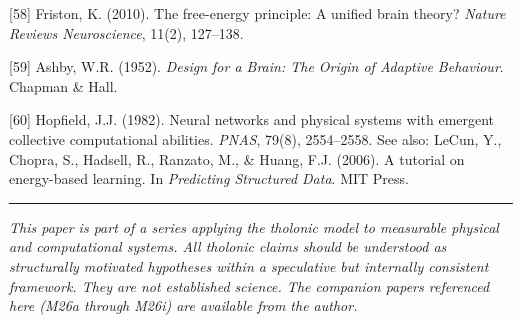 \documentclass[
  11pt,
  letterpaper,
]{article}
\begin{document}
{[}58{]} Friston, K. (2010). The free-energy principle: A unified brain
theory? \emph{Nature Reviews Neuroscience}, 11(2), 127--138.

{[}59{]} Ashby, W.R. (1952). \emph{Design for a Brain: The Origin of
Adaptive Behaviour}. Chapman \& Hall.

{[}60{]} Hopfield, J.J. (1982). Neural networks and physical systems
with emergent collective computational abilities. \emph{PNAS}, 79(8),
2554--2558. See also: LeCun, Y., Chopra, S., Hadsell, R., Ranzato, M.,
\& Huang, F.J. (2006). A tutorial on energy-based learning. In
\emph{Predicting Structured Data}. MIT Press.

\begin{center}\rule{0.5\linewidth}{0.5pt}\end{center}

\emph{This paper is part of a series applying the tholonic model to
measurable physical and computational systems. All tholonic claims
should be understood as structurally motivated hypotheses within a
speculative but internally consistent framework. They are not
established science. The companion papers referenced here (M26a through
M26i) are available from the author.}
\end{document}

